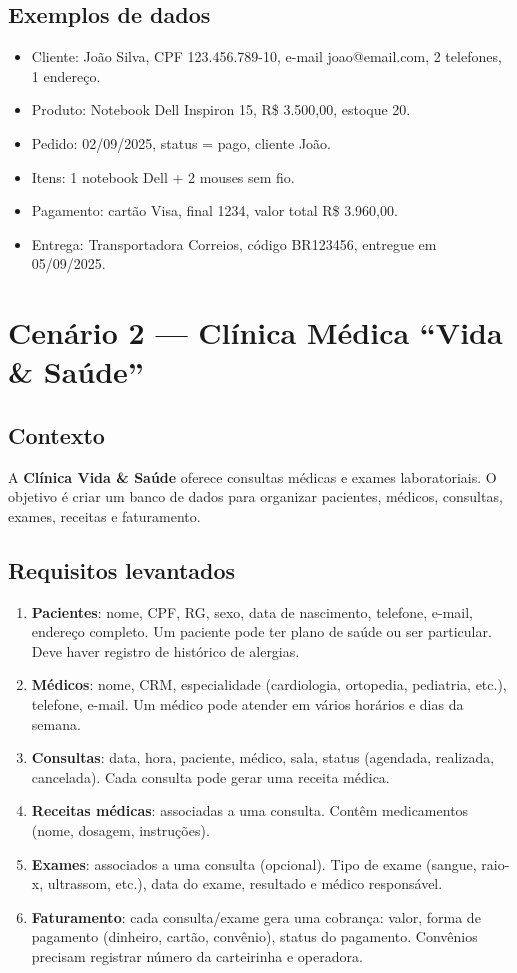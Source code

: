 \documentclass[12pt,a4paper]{article}
\begin{document}
\subsection*{Exemplos de dados}
\begin{itemize}
    \item Cliente: João Silva, CPF 123.456.789-10, e-mail joao@email.com, 2 telefones, 1 endereço.
    \item Produto: Notebook Dell Inspiron 15, R\$ 3.500,00, estoque 20.
    \item Pedido: 02/09/2025, status = pago, cliente João.
    \item Itens: 1 notebook Dell + 2 mouses sem fio.
    \item Pagamento: cartão Visa, final 1234, valor total R\$ 3.960,00.
    \item Entrega: Transportadora Correios, código BR123456, entregue em 05/09/2025.
\end{itemize}

\newpage
\section*{Cenário 2 — Clínica Médica ``Vida \& Saúde''}

\subsection*{Contexto}
A \textbf{Clínica Vida \& Saúde} oferece consultas médicas e exames laboratoriais.  
O objetivo é criar um banco de dados para organizar pacientes, médicos, consultas, exames, receitas e faturamento.

\subsection*{Requisitos levantados}
\begin{enumerate}
    \item \textbf{Pacientes}: nome, CPF, RG, sexo, data de nascimento, telefone, e-mail, endereço completo. Um paciente pode ter plano de saúde ou ser particular. Deve haver registro de histórico de alergias.
    \item \textbf{Médicos}: nome, CRM, especialidade (cardiologia, ortopedia, pediatria, etc.), telefone, e-mail. Um médico pode atender em vários horários e dias da semana.
    \item \textbf{Consultas}: data, hora, paciente, médico, sala, status (agendada, realizada, cancelada). Cada consulta pode gerar uma receita médica.
    \item \textbf{Receitas médicas}: associadas a uma consulta. Contêm medicamentos (nome, dosagem, instruções).
    \item \textbf{Exames}: associados a uma consulta (opcional). Tipo de exame (sangue, raio-x, ultrassom, etc.), data do exame, resultado e médico responsável.
    \item \textbf{Faturamento}: cada consulta/exame gera uma cobrança: valor, forma de pagamento (dinheiro, cartão, convênio), status do pagamento. Convênios precisam registrar número da carteirinha e operadora.
\end{enumerate}
\end{document}
